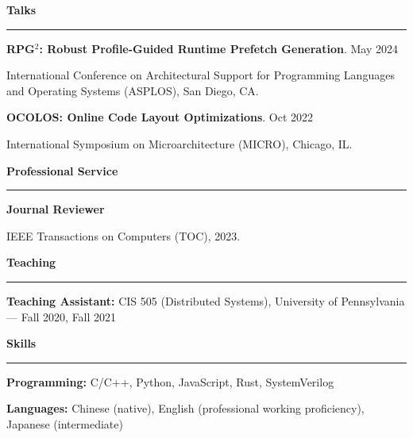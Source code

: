 \documentclass[10pt,letterpaper]{article}
\newcommand{\roottitle}[1]{\vspace{0.75em}\noindent\textbf{\large #1}\par\vspace{0.25em}\hrule\vspace{0.6em}}
\newcommand{\headedsection}[3]{\noindent #1\hfill #2\par #3\par}
\newcommand{\inlineheadsection}[2]{\noindent \textbf{#1} #2\par}
\newcommand{\nobreakvspace}[1]{\vspace{#1}}
\begin{document}
\roottitle{Talks}

\headedsection{\textbf{RPG$^2$: Robust Profile-Guided Runtime Prefetch Generation}. May 2024}{}{
  \inlineheadsection{ }{International Conference on Architectural Support for Programming Languages and Operating Systems (ASPLOS), San Diego, CA.}
}

\headedsection{\textbf{OCOLOS: Online Code Layout Optimizations}. Oct 2022}{}{
  \inlineheadsection{ }{International Symposium on Microarchitecture (MICRO), Chicago, IL.}
}

\roottitle{Professional Service}

\headedsection{\textbf{Journal Reviewer}}{}{
  \inlineheadsection{ }{IEEE Transactions on Computers (TOC), 2023.}
}

\roottitle{Teaching}

\inlineheadsection{Teaching Assistant:}{CIS 505 (Distributed Systems), University of Pennsylvania — Fall 2020, Fall 2021}

\roottitle{Skills}

\inlineheadsection{Programming:}{C/C++, Python, JavaScript, Rust, SystemVerilog}
\nobreakvspace{0.25em}
\inlineheadsection{Languages:}{Chinese (native), English (professional working proficiency), Japanese (intermediate)}
\end{document}
